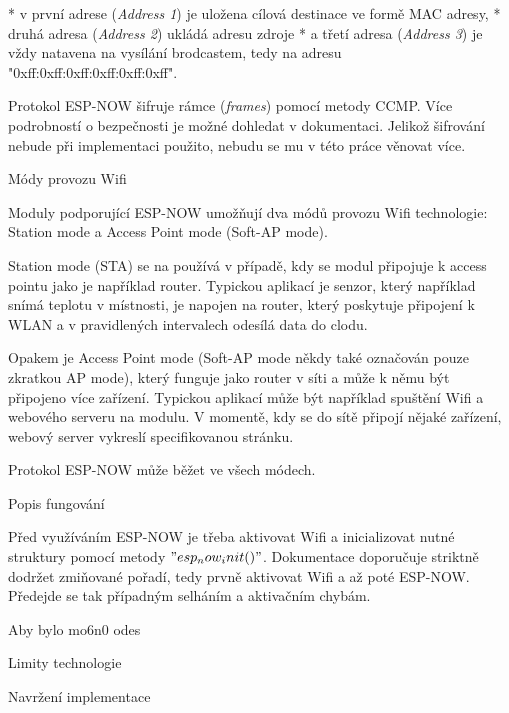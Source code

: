 \begitems
* v první adrese ({\em Address 1}) je uložena cílová destinace ve formě MAC adresy,
* druhá adresa ({\em Address 2}) ukládá adresu zdroje
* a třetí adresa ({\em Address 3}) je vždy natavena na vysílání brodcastem, tedy na adresu "0xff:0xff:0xff:0xff:0xff:0xff".
\enditems

Protokol ESP-NOW šifruje rámce ({\em frames}) pomocí metody CCMP. Více podrobností o bezpečnosti je možné dohledat v dokumentaci. Jelikož šifrování nebude při implementaci použito, nebudu se mu v této práce věnovat více.

\secc Módy provozu Wifi

Moduly podporující ESP-NOW umožňují dva módů provozu Wifi technologie: Station mode a Access Point mode (Soft-AP mode).

{\sbf Station mode} (STA) se na používá v případě, kdy se modul připojuje k access pointu jako je například router. Typickou aplikací je senzor, který například snímá teplotu v místnosti, je napojen na router, který poskytuje připojení k WLAN a v pravidlených intervalech odesílá data do clodu.

Opakem je {\sbf Access Point mode} (Soft-AP mode někdy také označován pouze zkratkou AP mode), který funguje jako router v síti a může k němu být připojeno více zařízení. Typickou aplikací může být například spuštění Wifi a webového serveru na modulu. V momentě, kdy se do sítě připojí nějaké zařízení, webový server vykreslí specifikovanou stránku.

Protokol ESP-NOW může běžet ve všech módech.

\secc Popis fungování

Před využíváním ESP-NOW je třeba aktivovat Wifi a {\sbf inicializovat} nutné struktury pomocí metody $"esp_now_init()"$. Dokumentace doporučuje striktně dodržet zmiňované pořadí, tedy prvně aktivovat Wifi a až poté ESP-NOW. Předejde se tak případným selháním a aktivačním chybám.

Aby bylo mo6n0 odes

\secc Limity technologie

\sec Navržení implementace